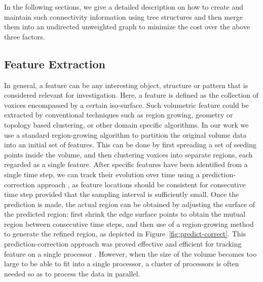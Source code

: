 \documentclass[10pt, conference, compsocconf]{IEEEtran}
\begin{document}
In the following sections, we give a detailed description on how to create and maintain such connectivity information using tree structures and then merge them into an undirected unweighted graph to minimize the cost over the above three factors.

\subsection{Feature Extraction}

In general, a feature can be any interesting object, structure or pattern that is considered relevant for investigation. Here, a feature is defined as the collection of voxices encompassed by a certain iso-surface. Such volumetric feature could be extracted by conventional techniques such as region growing, geometry or topology based clustering, or other domain specific algorithms. In our work we use a standard region-growing algorithm
\cite{Huang2003} to partition the original volume data into an initial set of features. This can be done by first spreading a set of seeding points inside the volume, and then clustering voxices into separate regions, each regarded as a single feature. After specific features have been identified from a single time step, we can track their evolution over time using a prediction-correction approach \cite{Muelder2009}, as feature locations should be consistent for consecutive time step provided that the sampling interval is sufficiently small. Once the prediction is made, the actual region can be obtained by adjusting the surface of the predicted region: first shrink the edge surface points to obtain the mutual region between consecutive time steps, and then use of a region-growing method to generate the refined region, as depicted in Figure~\ref{fig:predict-correct}. This prediction-correction approach was proved effective and efficient for tracking feature on a single processor \cite{Muelder2009}. However, when the size of the volume becomes too large to be able to fit into a single processor, a cluster of processors is often needed so as to process the data in parallel.
\end{document}
